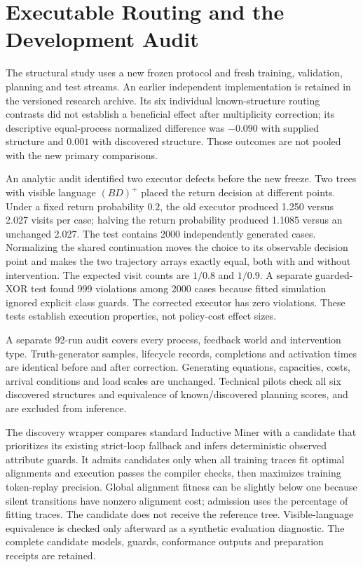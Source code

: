 \section{Executable Routing and the Development Audit}
The structural study uses a new frozen protocol and fresh training, validation, planning and test streams. An earlier independent implementation is retained in the versioned research archive. Its six individual known-structure routing contrasts did not establish a beneficial effect after multiplicity correction; its descriptive equal-process normalized difference was $-0.090$ with supplied structure and $0.001$ with discovered structure. Those outcomes are not pooled with the new primary comparisons.

An analytic audit identified two executor defects before the new freeze. Two trees with visible language $(BD)^+$ placed the return decision at different points. Under a fixed return probability $0.2$, the old executor produced 1.250 versus 2.027 visits per case; halving the return probability produced 1.1085 versus an unchanged 2.027. The test contains 2000 independently generated cases. Normalizing the shared continuation moves the choice to its observable decision point and makes the two trajectory arrays exactly equal, both with and without intervention. The expected visit counts are $1/0.8$ and $1/0.9$. A separate guarded-XOR test found 999 violations among 2000 cases because fitted simulation ignored explicit class guards. The corrected executor has zero violations. These tests establish execution properties, not policy-cost effect sizes.

A separate 92-run audit covers every process, feedback world and intervention type. Truth-generator samples, lifecycle records, completions and activation times are identical before and after correction. Generating equations, capacities, costs, arrival conditions and load scales are unchanged. Technical pilots check all six discovered structures and equivalence of known/discovered planning scores, and are excluded from inference.

The discovery wrapper compares standard Inductive Miner with a candidate that prioritizes its existing strict-loop fallback and infers deterministic observed attribute guards. It admits candidates only when all training traces fit optimal alignments and execution passes the compiler checks, then maximizes training token-replay precision. Global alignment fitness can be slightly below one because silent transitions have nonzero alignment cost; admission uses the percentage of fitting traces. The candidate does not receive the reference tree. Visible-language equivalence is checked only afterward as a synthetic evaluation diagnostic. The complete candidate models, guards, conformance outputs and preparation receipts are retained.

